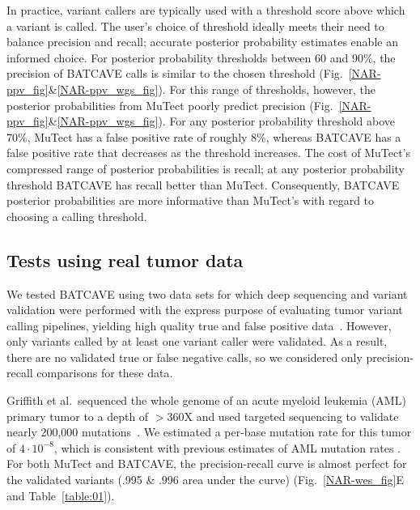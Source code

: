 \documentclass[a4,center,fleqn]{NAR}
\newcommand{\batcave}{BATCAVE\xspace}
\begin{document}
In practice, variant callers are typically used with a threshold score above which a variant is called.
The user's choice of threshold ideally meets their need to balance precision and recall; accurate posterior probability estimates enable an informed choice.
For posterior probability thresholds between 60 and 90\%, the precision of \batcave calls is similar to the chosen threshold (Fig.~\ref{NAR-ppv_fig}\&\ref{NAR-ppv_wgs_fig}).
For this range of thresholds, however, the posterior probabilities from MuTect poorly predict precision (Fig.~\ref{NAR-ppv_fig}\&\ref{NAR-ppv_wgs_fig}).
For any posterior probability threshold above 70\%, MuTect has a false positive rate of roughly 8\%, whereas \batcave has a false positive rate that decreases as the threshold increases.
The cost of MuTect's compressed range of posterior probabilities is recall; at any posterior probability threshold \batcave has recall better than MuTect.
Consequently, \batcave posterior probabilities are more informative than MuTect's with regard to choosing a calling threshold.

\subsection{Tests using real tumor data}
We tested \batcave using two data sets for which deep sequencing and variant validation were performed with the express purpose of evaluating tumor variant calling pipelines, yielding high quality true and false positive data~\cite{Griffith2015,Shi2018}.
However, only variants called by at least one variant caller were validated.
As a result, there are no validated true or false negative calls, so we considered only precision-recall comparisons for these data.

Griffith et al.\ sequenced the whole genome of an acute myeloid leukemia (AML) primary tumor to a depth of $>$360X and used targeted sequencing to validate nearly 200,000 mutations~\cite{Griffith2015}.
We estimated a per-base mutation rate for this tumor of $4\cdot10^{-8}$, which is consistent with previous estimates of AML mutation rates \cite{Griffith2015,Williams2018}.
For both MuTect and \batcave, the precision-recall curve is almost perfect for the validated variants (.995 \& .996 area under the curve) (Fig.~\ref{NAR-wes_fig}E and Table~\ref{table:01}).
\end{document}
